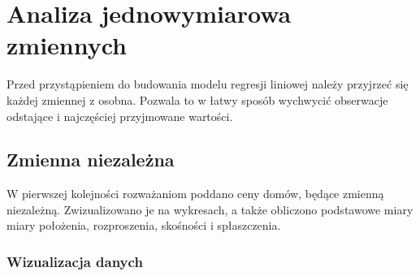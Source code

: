\documentclass{article}
\begin{document}
\begin{table}[H]
\centering
{}
\caption{Charakterystyka zmiennych}
\label{zmienne}
\end{table}
\section{Analiza jednowymiarowa zmiennych}
Przed przystąpieniem do budowania modelu regresji liniowej należy przyjrzeć się każdej zmiennej z osobna. Pozwala to w łatwy sposób wychwycić obserwacje odstające i najczęściej przyjmowane wartości.

\subsection{Zmienna niezależna}

W pierwszej kolejności rozważaniom poddano ceny domów, będące zmienną niezależną. Zwizualizowano je na wykresach, a także obliczono podstawowe miary miary położenia, rozproszenia, skośności i spłaszczenia.

\subsubsection{Wizualizacja danych} \label{wizual_zależna}
\end{document}
